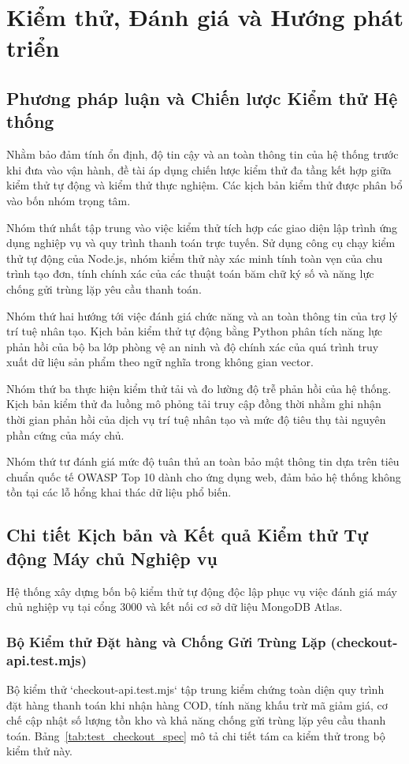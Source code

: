 \chapter{Kiểm thử, Đánh giá và Hướng phát triển}

\section{Phương pháp luận và Chiến lược Kiểm thử Hệ thống}
Nhằm bảo đảm tính ổn định, độ tin cậy và an toàn thông tin của hệ thống trước khi đưa vào vận hành, đề tài áp dụng chiến lược kiểm thử đa tầng kết hợp giữa kiểm thử tự động và kiểm thử thực nghiệm. Các kịch bản kiểm thử được phân bổ vào bốn nhóm trọng tâm.

Nhóm thứ nhất tập trung vào việc kiểm thử tích hợp các giao diện lập trình ứng dụng nghiệp vụ và quy trình thanh toán trực tuyến. Sử dụng công cụ chạy kiểm thử tự động của Node.js, nhóm kiểm thử này xác minh tính toàn vẹn của chu trình tạo đơn, tính chính xác của các thuật toán băm chữ ký số và năng lực chống gửi trùng lặp yêu cầu thanh toán.

Nhóm thứ hai hướng tới việc đánh giá chức năng và an toàn thông tin của trợ lý trí tuệ nhân tạo. Kịch bản kiểm thử tự động bằng Python phân tích năng lực phản hồi của bộ ba lớp phòng vệ an ninh và độ chính xác của quá trình truy xuất dữ liệu sản phẩm theo ngữ nghĩa trong không gian vector.

Nhóm thứ ba thực hiện kiểm thử tải và đo lường độ trễ phản hồi của hệ thống. Kịch bản kiểm thử đa luồng mô phỏng tải truy cập đồng thời nhằm ghi nhận thời gian phản hồi của dịch vụ trí tuệ nhân tạo và mức độ tiêu thụ tài nguyên phần cứng của máy chủ.

Nhóm thứ tư đánh giá mức độ tuân thủ an toàn bảo mật thông tin dựa trên tiêu chuẩn quốc tế OWASP Top 10 dành cho ứng dụng web, đảm bảo hệ thống không tồn tại các lỗ hổng khai thác dữ liệu phổ biến.

\section{Chi tiết Kịch bản và Kết quả Kiểm thử Tự động Máy chủ Nghiệp vụ}
Hệ thống xây dựng bốn bộ kiểm thử tự động độc lập phục vụ việc đánh giá máy chủ nghiệp vụ tại cổng 3000 và kết nối cơ sở dữ liệu MongoDB Atlas.

\subsection{Bộ Kiểm thử Đặt hàng và Chống Gửi Trùng Lặp (checkout-api.test.mjs)}
Bộ kiểm thử `checkout-api.test.mjs` tập trung kiểm chứng toàn diện quy trình đặt hàng thanh toán khi nhận hàng COD, tính năng khấu trừ mã giảm giá, cơ chế cập nhật số lượng tồn kho và khả năng chống gửi trùng lặp yêu cầu thanh toán. Bảng~\ref{tab:test_checkout_spec} mô tả chi tiết tám ca kiểm thử trong bộ kiểm thử này.

